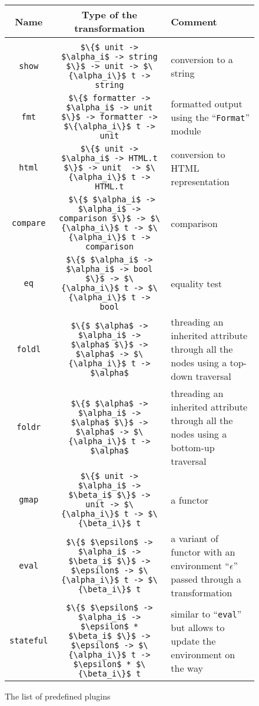 \begin{figure}[t]
  \center
  \small
  \begin{tabular}{ccp{4cm}}
    Name & Type of the transformation & Comment \\[3mm]
    \hline\\
    \lstinline|show| & \lstinline|$\{$ unit -> $\alpha_i$ -> string $\}$ -> unit -> $\{\alpha_i\}$ t -> string| & conversion to a string \\[2mm]
    \lstinline|fmt| & \lstinline|$\{$ formatter -> $\alpha_i$ -> unit $\}$ -> formatter -> $\{\alpha_i\}$ t -> unit| & formatted output using the ``\lstinline|Format|'' module \\[2mm]
    \lstinline|html| & \lstinline|$\{$ unit -> $\alpha_i$ -> HTML.t $\}$ -> unit  -> $\{\alpha_i\}$ t -> HTML.t| & conversion to HTML representation\\[2mm]
    \lstinline|compare| & \lstinline| $\{$ $\alpha_i$ -> $\alpha_i$ -> comparison $\}$ -> $\{\alpha_i\}$ t -> $\{\alpha_i\}$ t -> comparison| & comparison \\[2mm]
    \lstinline|eq| & \lstinline|$\{$ $\alpha_i$ -> $\alpha_i$ -> bool $\}$ -> $\{\alpha_i\}$ t -> $\{\alpha_i\}$ t -> bool| & equality test \\[2mm]
    \lstinline|foldl| & \lstinline |$\{$ $\alpha$ -> $\alpha_i$ -> $\alpha$ $\}$ -> $\alpha$ -> $\{\alpha_i\}$ t -> $\alpha$| & threading an inherited attribute through all the nodes using a top-down traversal \\[2mm]
    \lstinline|foldr| & \lstinline |$\{$ $\alpha$ -> $\alpha_i$ -> $\alpha$ $\}$ -> $\alpha$ -> $\{\alpha_i\}$ t -> $\alpha$| & threading an inherited attribute through all the nodes using a bottom-up traversal \\[2mm]
    \lstinline|gmap| & \lstinline|$\{$ unit -> $\alpha_i$ -> $\beta_i$ $\}$ -> unit -> $\{\alpha_i\}$ t -> $\{\beta_i\}$ t| & a functor\\[2mm]
    \lstinline|eval| & \lstinline|$\{$ $\epsilon$ -> $\alpha_i$ -> $\beta_i$ $\}$ -> $\epsilon$ -> $\{\alpha_i\}$ t -> $\{\beta_i\}$ t| & a variant of functor with an environment ``$\epsilon$'' passed through a transformation\\[2mm]
    \lstinline|stateful| & \lstinline|$\{$ $\epsilon$ -> $\alpha_i$ -> $\epsilon$ * $\beta_i$ $\}$ -> $\epsilon$ -> $\{\alpha_i\}$ t -> $\epsilon$ * $\{\beta_i\}$ t| & similar to ``\lstinline|eval|'' but allows to update the environment on the way        
  \end{tabular}
  \caption{The list of predefined plugins}
  \label{listofplugins}
\end{figure}

